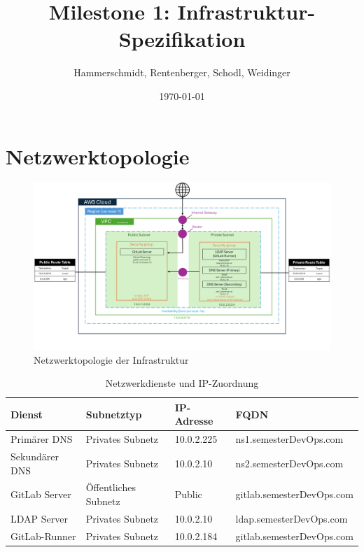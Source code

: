 \documentclass[a4paper,12pt]{article}
\title{Milestone 1: Infrastruktur-Spezifikation}
\author{Hammerschmidt, Rentenberger, Schodl, Weidinger}
\date{\today}
\begin{document}
\maketitle
\tableofcontents
\newpage

\section{Netzwerktopologie}

\begin{figure}[h!]
	\centering
	\includegraphics[width=\textwidth]{data/DevOps_Network_Topology.png}
	\caption{Netzwerktopologie der Infrastruktur}
	\label{fig:network_topology}
\end{figure}

\begin{table}[h!]
	\centering
	\begin{tabular}{|l|l|l|l|}
		\hline
		\textbf{Dienst} & \textbf{Subnetztyp}  & \textbf{IP-Adresse} & \textbf{FQDN}      \\ \hline
		Primärer DNS    & Privates Subnetz     & 10.0.2.225          & ns1.semesterDevOps.com   \\ \hline
		Sekundärer DNS  & Privates Subnetz     & 10.0.2.10           & ns2.semesterDevOps.com   \\ \hline
		GitLab Server   & Öffentliches Subnetz & Public              & gitlab.semesterDevOps.com \\ \hline
		LDAP Server     & Privates Subnetz     & 10.0.2.10           & ldap.semesterDevOps.com   \\ \hline
		GitLab-Runner	& Privates Subnetz	   & 10.0.2.184			 & gitlab.semesterDevOps.com \\ \hline
	\end{tabular}
	\caption{Netzwerkdienste und IP-Zuordnung}
\end{table}
\end{document}
